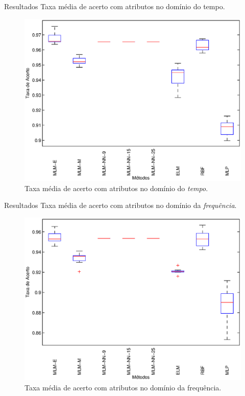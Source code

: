 \documentclass{beamer}
\begin{document}
\begin{frame}{Resultados}
Taxa média de acerto com atributos no domínio do tempo.
\begin{figure}[h!]
\begin{center}
	\includegraphics[scale=0.4]{box_temp.eps}
	\caption{Taxa média de acerto com atributos no domínio do \textit{tempo}.}
	\label{img:box_temp}
	\end{center}
\end{figure}

\end{frame}

\begin{frame}{Resultados}
Taxa média de acerto com atributos no domínio da \textit{frequência}.
\begin{figure}[h!]
\begin{center}
	\includegraphics[scale=0.4]{box_freq.eps}
	\caption{Taxa média de acerto com atributos no domínio da frequência.}
	\label{img:box_freq}
	\end{center}
\end{figure}
\end{frame}
\end{document}
